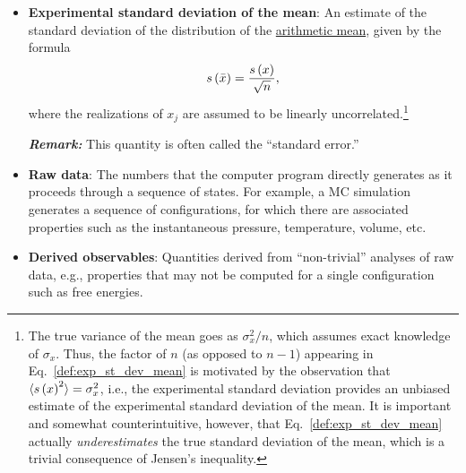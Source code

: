 \begin{itemize}
\item {\bf Experimental standard deviation of the mean}: An estimate of the standard deviation of the distribution of the \hyperref[def:arith_mean]{arithmetic mean}, given by the formula
  \begin{equation}
    s\left( \bar{x} \right) = \dfrac{s\left( x \right)}{\sqrt{n}}, \label{def:exp_st_dev_mean}
  \end{equation}
  where the realizations of $x_j$ are assumed to be linearly uncorrelated.\footnote{The true variance of the mean goes as $\sigma_x^2/n$, which assumes exact knowledge of $\sigma_x$.  Thus, the factor of $n$ (as opposed to $n-1$) appearing in Eq.~\eqref{def:exp_st_dev_mean} is motivated by the observation that $\langle s\left( x \right)^2 \rangle = \sigma_x^2$, i.e., the experimental standard deviation provides an unbiased estimate of the experimental standard deviation of the mean.  It is important and somewhat counterintuitive, however, that Eq.~\eqref{def:exp_st_dev_mean} actually {\it underestimates} the true standard deviation of the mean, which is a trivial consequence of Jensen's inequality. }

\smallskip
\textbf{\textit{Remark:}} This quantity is often called the ``standard error.''


\item {\bf Raw data}: The numbers that the computer program directly generates as it proceeds through a sequence of states.
For example, a MC simulation generates a sequence of configurations, for which there are associated properties such as the instantaneous pressure, temperature, volume, etc.
\label{def:raw_data}
\item {\bf Derived observables}: Quantities derived from ``non-trivial'' analyses of raw data, e.g., properties that may not be computed for a single configuration such as free energies.
  \label{def:deriv_obs}



\end{itemize}
